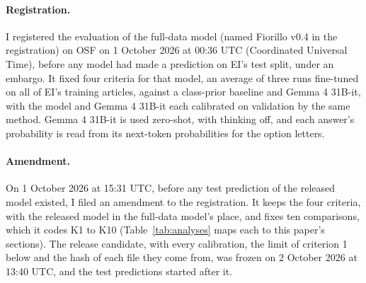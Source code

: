 \documentclass[11pt,letterpaper]{article}
\begin{document}
\paragraph{Registration.} I registered the evaluation of the full-data model (named Fiorillo v0.4 in the registration) on OSF \citep{osfreg} on 1 October 2026 at 00:36 UTC (Coordinated Universal Time), before any model had made a prediction on EI's test split, under an embargo. It fixed four criteria for that model, an average of three runs fine-tuned on all of EI's training articles, against a class-prior baseline and Gemma 4 31B-it, with the model and Gemma 4 31B-it each calibrated on validation by the same method. Gemma 4 31B-it is used zero-shot, with thinking off, and each answer's probability is read from its next-token probabilities for the option letters.

\paragraph{Amendment.} On 1 October 2026 at 15:31 UTC, before any test prediction of the released model existed, I filed an amendment to the registration. It keeps the four criteria, with the released model in the full-data model's place, and fixes ten comparisons, which it codes K1 to K10 (Table~\ref{tab:analyses} maps each to this paper's sections). The release candidate, with every calibration, the limit of criterion 1 below and the hash of each file they come from, was frozen on 2 October 2026 at 13:40 UTC, and the test predictions started after it.
\end{document}
